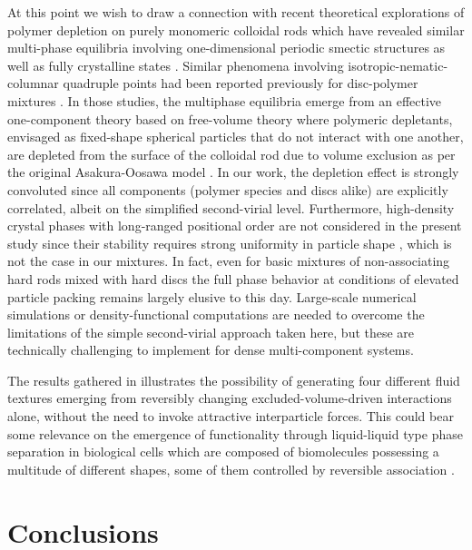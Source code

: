  At this point we wish to draw a connection with recent theoretical explorations of polymer depletion on purely monomeric colloidal rods which have revealed similar multi-phase equilibria involving one-dimensional periodic smectic structures as well as fully crystalline states \cite{peters_prl2020}. Similar phenomena involving isotropic-nematic-columnar quadruple points had been reported previously for disc-polymer mixtures \cite{gonzalez2017}. In those studies, the multiphase equilibria emerge from an effective one-component theory based on free-volume theory where   polymeric depletants, envisaged as fixed-shape spherical particles that do not interact with one another, are depleted from the surface of the colloidal rod due to volume exclusion as per the original Asakura-Oosawa model \cite{ASAKURA54,ASAKURA58,Vrijdepletie}. In our work, the depletion effect is strongly convoluted since all components (polymer species and discs alike) are explicitly correlated, albeit on the simplified second-virial level. Furthermore, high-density crystal phases with long-ranged positional order are not considered in the present study since their stability requires strong uniformity in particle shape \cite{mederos_overview2014}, which is not the case in our mixtures. In fact, even for basic mixtures of non-associating hard rods mixed with hard discs the full phase behavior at conditions of elevated particle packing  remains largely elusive to this day. Large-scale  numerical simulations or density-functional computations are needed  to overcome the limitations of the simple second-virial approach taken here, but these are technically challenging to implement for dense multi-component systems. 
 
 The results gathered in   illustrates the possibility of generating four different fluid textures emerging from reversibly changing excluded-volume-driven interactions alone, without the need to invoke attractive interparticle forces. This could bear some relevance on the emergence of functionality through liquid-liquid type phase separation in biological cells which are composed of biomolecules possessing a multitude of different shapes, some of them  controlled by reversible association \cite{hyman2014,shin2017}.
 
\section{Conclusions}

